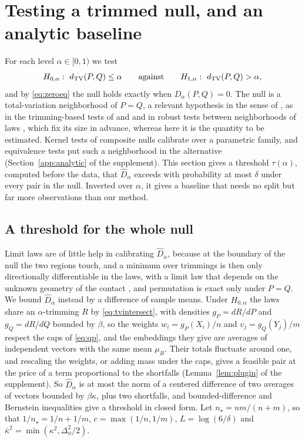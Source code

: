 \section{Testing a trimmed null, and an analytic baseline}
\label{sec:analytic}

For each level $\alpha\in[0,1)$ we test
\begin{equation}
H_{0,\alpha}:\ d_{\mathrm{TV}}(P,Q)\le\alpha
\qquad\text{against}\qquad
H_{1,\alpha}:\ d_{\mathrm{TV}}(P,Q)>\alpha ,
\label{eq:null}
\end{equation}
and by \eqref{eq:zeroeq} the null holds exactly when $D_\alpha(P,Q)=0$. The null is a total-variation neighborhood of
$P=Q$, a relevant hypothesis in the sense of \citet{dettekokotaue2020}, as in the trimming-based tests of
\citet{alvarez2012similarity} and \citet{delbarrio2020ks} and in robust tests between neighborhoods of laws
\citep{huber1965robust,huber1973minimax,schrab2025robust,liubriol2025robust}, which fix its size in advance, whereas
here it is the quantity to be estimated. Kernel tests of composite nulls \citep{key2025composite} calibrate over a
parametric family, and equivalence tests \citep{wellek2010equivalence} put such a neighborhood in the alternative
(Section~\ref{app:analytic} of the supplement). This section gives a threshold $\tau(\alpha)$, computed before the
data, that $\widehat D_\alpha$ exceeds with probability at most $\delta$ under every pair in the null. Inverted over
$\alpha$, it gives a baseline that needs no split but far more observations than our method.

\subsection{A threshold for the whole null}

Limit laws are of little help in calibrating $\widehat D_\alpha$, because at the boundary of the null the two regions
touch, and a minimum over trimmings is then only directionally differentiable in the laws, with a limit law that
depends on the unknown geometry of the contact \citep{fang2019inference}, and permutation is exact only under $P=Q$. We
bound $\widehat D_\alpha$ instead by a difference of sample means. Under $H_{0,\alpha}$ the laws share an
$\alpha$-trimming $R$ by \eqref{eq:tvintersect}, with densities $g_P=dR/dP$ and $g_Q=dR/dQ$ bounded by $\beta$, so the
weights $w_i=g_P(X_i)/n$ and $v_j=g_Q(Y_j)/m$ respect the caps of \eqref{eq:qp}, and the embeddings they give are
averages of independent vectors with the same mean $\mu_R$. Their totals fluctuate around one, and rescaling the weights,
or adding mass under the caps, gives a feasible pair at the price of a term proportional to the shortfalls
(Lemma~\ref{lem:plugin} of the supplement). So $\widehat D_\alpha$ is at most the norm of a centered difference of two
averages of vectors bounded by $\beta\kappa$, plus two shortfalls, and bounded-difference and Bernstein inequalities
give a threshold in closed form. Let $n_\star=nm/(n+m)$, so that $1/n_\star=1/n+1/m$, $c=\max(1/n,1/m)$, $L=\log(6/\delta)$ and $\bar\kappa^2=\min(\kappa^2,\Delta_\phi^2/2)$.

